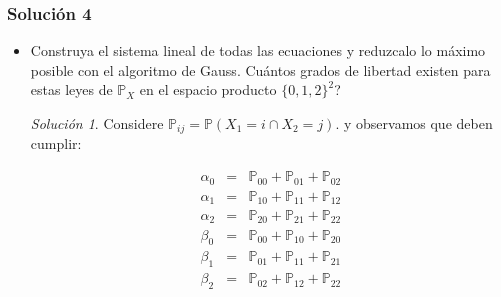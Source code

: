 \documentclass[notitlepage]{article}
\theoremstyle{definition}
\theoremstyle{remark}
\newtheorem*{sol}{Solución}
\newcommand{\pr}[1]{\mathbb{P}_{#1}}
\newcommand{\prob}[1]{\mathbb{P}(#1)}
\begin{document}
	\subsubsection*{Solución 4}
	\begin{itemize}
		\item Construya el sistema lineal de todas las ecuaciones y reduzcalo lo máximo posible con el algoritmo de Gauss. Cuántos grados de libertad existen para estas leyes de $ \mathbb{P}_X $ en el espacio producto $ \{0,1,2\}^2 $?
		\begin{sol}
			Considere $ \pr{ij}=\prob{X_1=i \cap X_2 = j} $. y observamos que deben cumplir:
			
			\begin{eqnarray}
			\alpha_0 &=&\pr{00}+\pr{01}+\pr{02} \nonumber
			\\\alpha_1 &=& \pr{10}+\pr{11}+\pr{12} \nonumber
			\\\alpha_2 &=& \pr{20}+\pr{21}+\pr{22} \nonumber
			\\\beta_0 &=& \pr{00}+\pr{10}+\pr{20} \nonumber
			\\\beta_1 &=& \pr{01}+\pr{11}+\pr{21} \nonumber
			\\\beta_2 &=& \pr{02}+\pr{12}+\pr{22} \nonumber
			\end{eqnarray}
			

\end{sol}
\end{itemize}
\end{document}
